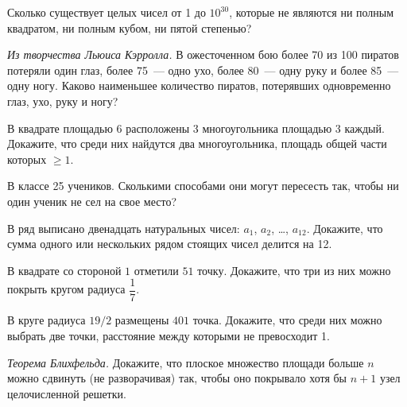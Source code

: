 \begin{problems}

\item
Сколько существует целых чисел от 1 до $10^{30}$, которые не являются ни полным квадратом, ни полным кубом, ни пятой степенью?

\item\emph{Из творчества Льюиса Кэрролла.}
В ожесточенном бою более 70 из 100 пиратов потеряли один глаз, более 75~---
одно ухо, более 80~--- одну руку и более 85~--- одну ногу.
Каково наименьшее количество пиратов, потерявших одновременно глаз, ухо, руку и
ногу?

\item
В квадрате площадью 6 расположены 3 многоугольника площадью 3 каждый.
Докажите, что среди них найдутся два многоугольника, площадь общей части
которых $\geq 1$.

\item
В классе 25 учеников.
Сколькими способами они могут пересесть так, чтобы ни один ученик не сел на
свое место?

\item
В ряд выписано двенадцать натуральных чисел:
$a_1$, $a_2$, \ldots, $a_{12}$.
Докажите, что сумма одного или нескольких рядом стоящих чисел делится на 12.%

\item
В квадрате со стороной $1$ отметили $51$ точку.
Докажите, что три из них можно покрыть кругом радиуса $\dfrac{1}{7}$.

\item
В круге радиуса $19 / 2$ размещены $401$ точка.
Докажите, что среди них можно выбрать две точки, расстояние между которыми не
превосходит 1.

\item
\emph{Теорема Блихфельда.}
Докажите, что плоское множество площади больше $n$ можно сдвинуть
(не разворачивая) так, чтобы оно покрывало хотя бы $n + 1$ узел целочисленной
решетки.

\end{problems}

